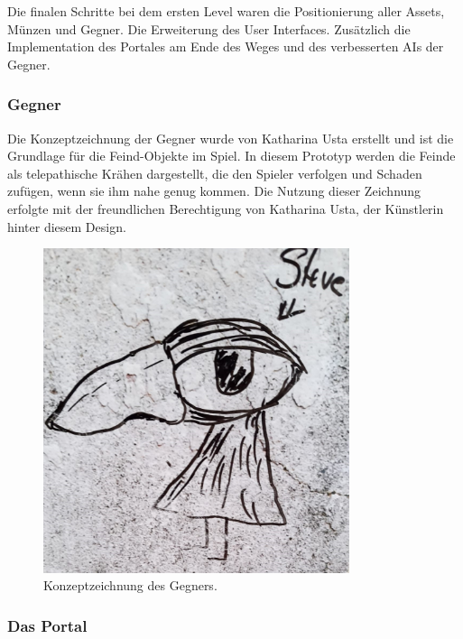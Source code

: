 Die finalen Schritte bei dem ersten Level waren die Positionierung aller Assets, Münzen und Gegner. Die Erweiterung des User Interfaces. Zusätzlich die Implementation des Portales am Ende des Weges und des verbesserten AIs der Gegner.

\subsubsection{Gegner}


\begin{minipage}[t]{0.5\textwidth}
Die Konzeptzeichnung der Gegner wurde von Katharina Usta erstellt und ist die Grundlage für die Feind-Objekte im Spiel. In diesem Prototyp werden die Feinde als telepathische Krähen dargestellt, die den Spieler verfolgen und Schaden zufügen, wenn sie ihm nahe genug kommen. Die Nutzung dieser Zeichnung erfolgte mit der freundlichen Berechtigung von Katharina Usta, der Künstlerin hinter diesem Design.

\end{minipage}
\hfill
\begin{minipage}[t]{0.5\textwidth}
  \begin{figure}[H]
    \centering
    \includegraphics[width=0.8\textwidth]{chapters/04/images/V3/steve.jpg}
    \caption{Konzeptzeichnung des Gegners.}
  \end{figure}
\end{minipage}

\subsubsection{Das Portal}

